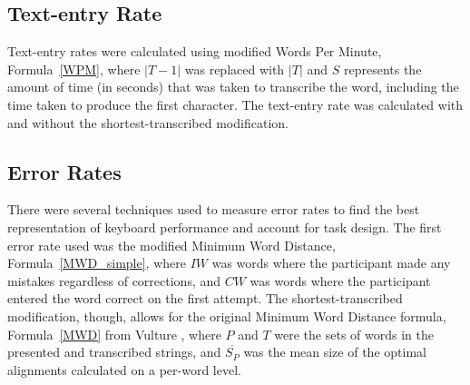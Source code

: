 \begin{table}[!b] %
	\centering
	\caption[Backspace-transcribed Examples]{\centering Examples of the backspace-transcribed modification.}
	\label{backspace_presented}
\end{table}

\subsection{Text-entry Rate}
Text-entry rates were calculated using modified Words Per Minute, Formula~\ref{WPM}, where $|T-1|$ was replaced with $|T|$ and $S$ represents the amount of time (in seconds) that was taken to transcribe the word, including the time taken to produce the first character. The text-entry rate was calculated with and without the shortest-transcribed modification.

\subsection{Error Rates}
There were several techniques used to measure error rates to find the best representation of keyboard performance and account for task design. The first error rate used was the modified Minimum Word Distance, Formula~\ref{MWD_simple}, where $IW$ was words where the participant made any mistakes regardless of corrections, and $CW$ was words where the participant entered the word correct on the first attempt. The shortest-transcribed modification, though, allows for the original Minimum Word Distance formula, Formula~\ref{MWD} from Vulture \cite{ref_vulture}, where $P$ and $T$ were the sets of words in the presented and transcribed strings, and $\overline{S_P}$ was the mean size of the optimal alignments calculated on a per-word level.

